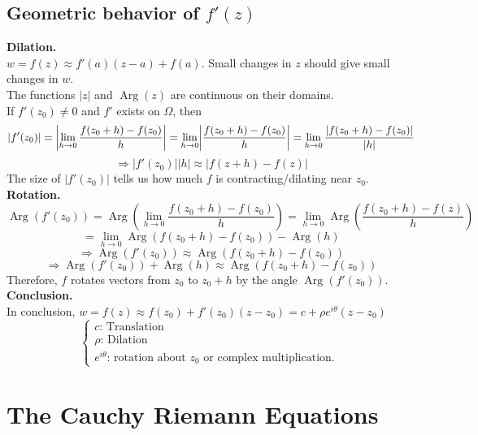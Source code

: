 \documentclass[11pt]{article}
\DeclarePairedDelimiter\abs{\lvert}{\rvert}
\begin{document}
\subsection{Geometric behavior of $f'(z)$}
\textbf{Dilation.}\\ 
$w = f(z) \approx f'(a)(z - a) + f(a)$. Small changes in $z$ should give small changes in $w$. \\
The functions $|z|$ and $\operatorname{Arg}(z)$ are continuous on their domains. \\
If $f'(z_0) \neq 0$ and $f'$ exists on $\Omega$, then 
$$ |f'(z_0)| = \abs*{\lim_{h \to 0}\frac{f(z_0 + h) - f(z_0)}{h}} = \lim_{h \to 0} \abs*{\frac{f(z_0 + h) - f(z_0)}{h}} = \lim_{h \to 0}\frac{|f(z_0 + h) - f(z_0)|}{|h|}$$
$$\Longrightarrow |f'(z_0)||h| \approx |f(z + h) - f(z)|$$
The size of $|f'(z_0)|$ tells us how much $f$ is contracting/dilating near $z_0$. \\
\newline
\textbf{Rotation.}\\
$$\operatorname{Arg}(f'(z_0)) = \operatorname{Arg}\left(\lim_{h \to 0}\frac{f(z_0 + h) - f(z_0)}{h}\right) = \lim_{h \to 0}\operatorname{Arg}\left(\frac{f(z_0 + h) - f(z)}{h}\right)$$
$$ = \lim_{h \to 0} \operatorname{Arg}(f(z_0 + h) - f(z_0)) - \operatorname{Arg}(h)$$
$$\Longrightarrow \operatorname{Arg}(f'(z_0)) \approx \operatorname{Arg}(f(z_0 + h) - f(z_0))$$ 
$$\Longrightarrow \operatorname{Arg}(f'(z_0)) + \operatorname{Arg}(h) \approx \operatorname{Arg}(f(z_0 + h) - f(z_0))$$
Therefore, $f$ rotates vectors from $z_0$ to $z_0 + h$ by the angle $\operatorname{Arg}(f'(z_0))$. \\
\newline
\textbf{Conclusion.} \\
In conclusion, $w = f(z) \approx f(z_0) + f'(z_0)(z - z_0) = c + \rho e^{i\theta}(z - z_0)$ \\
\[ \begin{cases} 
c\mbox{: Translation }\\
\rho \mbox{: Dilation }\\
e^{i\theta} \mbox{: rotation about $z_0$ or complex multiplication. }
   \end{cases}
\]

\newpage
\section{The Cauchy Riemann Equations}
\end{document}
